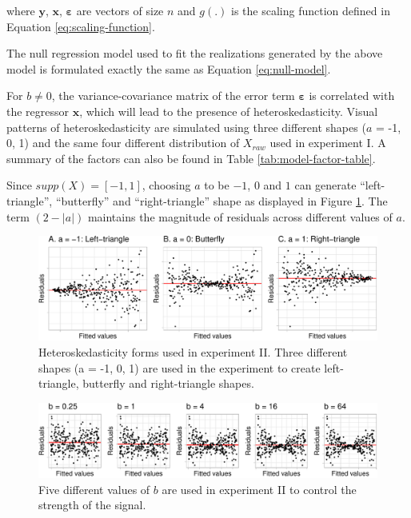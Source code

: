 \documentclass[]{interact}
\theoremstyle{plain}%
\theoremstyle{definition}
\theoremstyle{remark}
\begin{document}
\noindent where \(\boldsymbol{y}\), \(\boldsymbol{x}\),
\(\boldsymbol{\varepsilon}\) are vectors of size \(n\) and \(g(.)\) is
the scaling function defined in Equation \ref{eq:scaling-function}.

The null regression model used to fit the realizations generated by the
above model is formulated exactly the same as Equation
\ref{eq:null-model}.

For \(b \neq 0\), the variance-covariance matrix of the error term
\(\boldsymbol{\varepsilon}\) is correlated with the regressor
\(\boldsymbol{x}\), which will lead to the presence of
heteroskedasticity. Visual patterns of heteroskedasticity are simulated
using three different shapes (\(a\) = -1, 0, 1) and the same four
different distribution of \(X_{raw}\) used in experiment I. A summary of
the factors can also be found in Table \ref{tab:model-factor-table}.

Since \(supp(X) = [-1, 1]\), choosing \(a\) to be \(-1\), \(0\) and
\(1\) can generate ``left-triangle'', ``butterfly'' and
``right-triangle'' shape as displayed in Figure
\ref{fig:different-shape-of-heter}. The term \((2 - |a|)\) maintains the
magnitude of residuals across different values of \(a\).

\begin{figure}

{\centering \includegraphics[width=1\linewidth]{paper_comparison_files/figure-latex/different-shape-of-heter-1} 

}

\caption{Heteroskedasticity forms used in experiment II. Three different shapes (a = -1, 0, 1) are used in the experiment to create left-triangle, butterfly and right-triangle shapes.}\label{fig:different-shape-of-heter}
\end{figure}

\begin{figure}

{\centering \includegraphics[width=1\linewidth]{paper_comparison_files/figure-latex/different-b-1} 

}

\caption{Five different values of $b$ are used in experiment II to control the strength of the signal.}\label{fig:different-b}
\end{figure}
\end{document}
